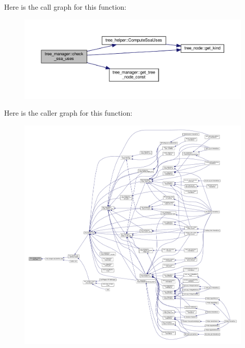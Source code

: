 Here is the call graph for this function\+:
\nopagebreak
\begin{figure}[H]
\begin{center}
\leavevmode
\includegraphics[width=350pt]{d2/ddd/classtree__manager_a6fae9da2246a0c0ea6fb1bdaeef7d54f_cgraph}
\end{center}
\end{figure}
Here is the caller graph for this function\+:
\nopagebreak
\begin{figure}[H]
\begin{center}
\leavevmode
\includegraphics[width=350pt]{d2/ddd/classtree__manager_a6fae9da2246a0c0ea6fb1bdaeef7d54f_icgraph}
\end{center}
\end{figure}
\mbox{\label{classtree__manager_ac728a1e9ad1c48fe09936df555cb9980}} 
